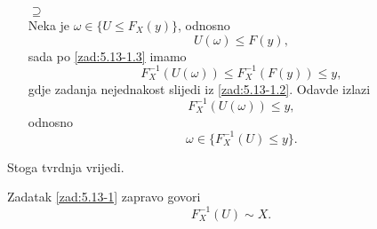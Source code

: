 \begin{rj}[\ref{zad:5.13-1}]
\begin{itemize}
        \item[$\supseteq$]
        \quad \\
        Neka je $\omega \in \{ U \leq F_X(y) \}$, odnosno
        \begin{equation*}
            U (\omega) \leq F(y),
        \end{equation*} 
        sada po \ref{zad:5.13-1.3} imamo
        \begin{equation*}
            F_X^{-1} (U(\omega)) \leq F_X^{-1} (F(y)) \leq y,
        \end{equation*}
        gdje zadanja nejednakost slijedi iz \ref{zad:5.13-1.2}.
        Odavde izlazi
        \begin{equation*}
            F_X^{-1} (U(\omega)) \leq y,
        \end{equation*}
        odnosno
        \begin{equation*}
            \omega \in \{ F_X^{-1} (U) \leq y \}.
        \end{equation*}
    \end{itemize}
    Stoga tvrdnja vrijedi.
\end{rj}

\begin{nap} \label{nap:5.13-2}
    Zadatak \ref{zad:5.13-1} zapravo govori
    \begin{equation*}
        F_X^{-1} (U) \sim X.
    \end{equation*}
\end{nap}